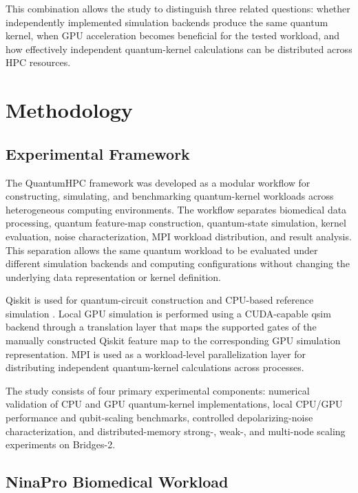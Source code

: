 \documentclass[pdflatex,sn-mathphys-num]{sn-jnl}%
\theoremstyle{thmstyleone}%
\theoremstyle{thmstyletwo}%
\theoremstyle{thmstylethree}%
\begin{document}
This combination allows the study to distinguish three related questions:
whether independently implemented simulation backends produce the same quantum
kernel, when GPU acceleration becomes beneficial for the tested workload, and
how effectively independent quantum-kernel calculations can be distributed
across HPC resources.

\section{Methodology}\label{sec:methodology}

\subsection{Experimental Framework}\label{subsec:framework}

The QuantumHPC framework was developed as a modular workflow for constructing,
simulating, and benchmarking quantum-kernel workloads across heterogeneous
computing environments. The workflow separates biomedical data processing,
quantum feature-map construction, quantum-state simulation, kernel evaluation,
noise characterization, MPI workload distribution, and result analysis. This
separation allows the same quantum workload to be evaluated under different
simulation backends and computing configurations without changing the underlying
data representation or kernel definition.

Qiskit is used for quantum-circuit construction and CPU-based reference
simulation \cite{qiskit2024,qiskitaer2025}. Local GPU simulation is performed
using a CUDA-capable qsim backend through a translation layer that maps the
supported gates of the manually constructed Qiskit feature map to the
corresponding GPU simulation representation. MPI is used as a workload-level
parallelization layer for distributing independent quantum-kernel calculations
across processes.

The study consists of four primary experimental components: numerical validation
of CPU and GPU quantum-kernel implementations, local CPU/GPU performance and
qubit-scaling benchmarks, controlled depolarizing-noise characterization, and
distributed-memory strong-, weak-, and multi-node scaling experiments on
Bridges-2.


\subsection{NinaPro Biomedical Workload}\label{subsec:ninapro}
\end{document}
